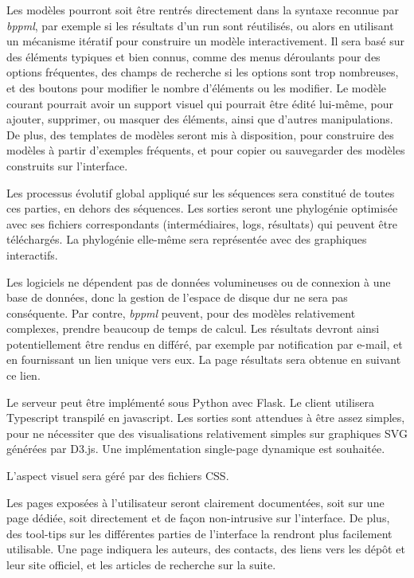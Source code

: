 Les modèles pourront
soit être rentrés directement dans la syntaxe reconnue par \textit{bppml},
par exemple si les résultats d'un run sont réutilisés,
ou alors en utilisant un mécanisme itératif pour construire un modèle interactivement.
Il sera basé sur des éléments typiques et bien connus,
comme des menus déroulants pour des options fréquentes,
des champs de recherche si les options sont trop nombreuses,
et des boutons pour modifier le nombre d'éléments ou les modifier.
Le modèle courant pourrait avoir un support visuel
qui pourrait être édité lui-même,
pour ajouter, supprimer, ou masquer des éléments,
ainsi que d'autres manipulations.
De plus, des templates de modèles seront mis à disposition,
pour construire des modèles à partir d'exemples fréquents,
et pour copier ou sauvegarder des modèles construits sur l'interface.

Les processus évolutif global appliqué sur les séquences
sera constitué de toutes ces parties, en dehors des séquences.
Les sorties seront une phylogénie optimisée
avec ses fichiers correspondants
(intermédiaires, logs, résultats)
qui peuvent être téléchargés.
La phylogénie elle-même sera représentée avec des graphiques interactifs.

Les logiciels ne dépendent pas de données volumineuses
ou de connexion à une base de données,
donc la gestion de l'espace de disque dur ne sera pas conséquente.
Par contre, \textit{bppml} peuvent,
pour des modèles relativement complexes,
prendre beaucoup de temps de calcul.
Les résultats devront ainsi potentiellement
être rendus en différé,
par exemple par notification par e-mail,
et en fournissant un lien unique vers eux.
La page résultats sera obtenue en suivant ce lien.

Le serveur peut être implémenté sous Python avec Flask.
Le client utilisera Typescript transpilé en javascript.
Les sorties sont attendues à être assez simples,
pour ne nécessiter que des visualisations relativement simples
sur graphiques SVG générées par D3.js.
Une implémentation single-page dynamique est souhaitée.

L'aspect visuel sera géré par des fichiers CSS.

Les pages exposées à l'utilisateur seront clairement documentées,
soit sur une page dédiée,
soit directement et de façon non-intrusive sur l'interface.
De plus, des tool-tips sur les différentes parties de l'interface
la rendront plus facilement utilisable.
Une page indiquera les auteurs, des contacts,
des liens vers les dépôt et leur site officiel,
et les articles de recherche sur la suite.

